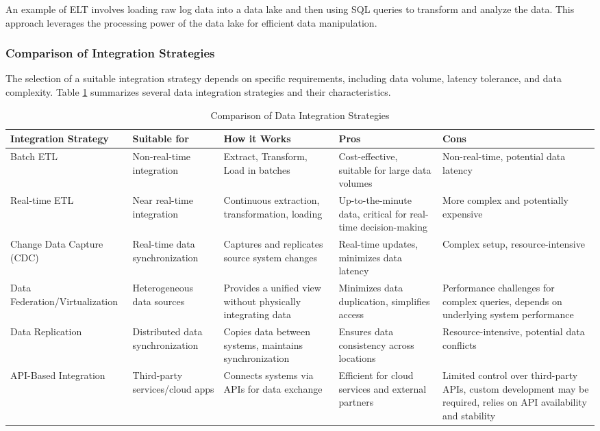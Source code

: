 \documentclass[12pt]{book}
\begin{document}
An example of ELT involves loading raw log data into a data lake and then using SQL queries to transform and analyze the data. This approach leverages the processing power of the data lake for efficient data manipulation.

\subsubsection{Comparison of Integration Strategies}

The selection of a suitable integration strategy depends on specific requirements, including data volume, latency tolerance, and data complexity. Table \ref{tab:integration_strategies} summarizes several data integration strategies and their characteristics.

\begin{table}[h!]
\centering
\caption{Comparison of Data Integration Strategies}
\label{tab:integration_strategies}
\begin{tabular}{|p{4cm}|p{3cm}|p{5cm}|p{4cm}|p{4cm}|}
\hline
\textbf{Integration Strategy} & \textbf{Suitable for} & \textbf{How it Works} & \textbf{Pros} & \textbf{Cons} \\
\hline
Batch ETL & Non-real-time integration & Extract, Transform, Load in batches & Cost-effective, suitable for large data volumes & Non-real-time, potential data latency \\
\hline
Real-time ETL & Near real-time integration & Continuous extraction, transformation, loading & Up-to-the-minute data, critical for real-time decision-making & More complex and potentially expensive \\
\hline
Change Data Capture (CDC) & Real-time data synchronization & Captures and replicates source system changes & Real-time updates, minimizes data latency & Complex setup, resource-intensive \\
\hline
Data Federation/Virtualization & Heterogeneous data sources & Provides a unified view without physically integrating data & Minimizes data duplication, simplifies access & Performance challenges for complex queries, depends on underlying system performance\\
\hline
Data Replication & Distributed data synchronization & Copies data between systems, maintains synchronization & Ensures data consistency across locations & Resource-intensive, potential data conflicts \\
\hline
API-Based Integration & Third-party services/cloud apps & Connects systems via APIs for data exchange & Efficient for cloud services and external partners & Limited control over third-party APIs, custom development may be required, relies on API availability and stability \\
\hline
\end{tabular}
\end{table}
\end{document}
